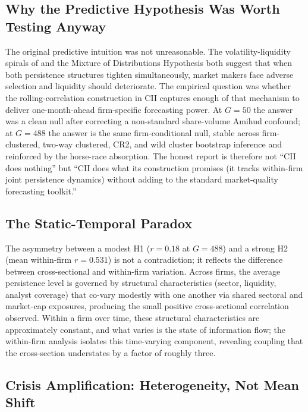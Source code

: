 \documentclass[preprint,12pt,authoryear]{elsarticle}
\begin{document}
\subsection{Why the Predictive Hypothesis Was Worth Testing Anyway}

The original predictive intuition was not unreasonable. The volatility-liquidity spirals of \citet{brunnermeier2009market} and the Mixture of Distributions Hypothesis \citep{clark1973subordinated, andersen1996return} both suggest that when both persistence structures tighten simultaneously, market makers face adverse selection and liquidity should deteriorate. The empirical question was whether the rolling-correlation construction in CII captures enough of that mechanism to deliver one-month-ahead firm-specific forecasting power. At $G = 50$ the answer was a clean null after correcting a non-standard share-volume Amihud confound; at $G = 488$ the answer is the same firm-conditional null, stable across firm-clustered, two-way clustered, CR2, and wild cluster bootstrap inference and reinforced by the horse-race absorption. The honest report is therefore not ``CII does nothing'' but ``CII does what its construction promises (it tracks within-firm joint persistence dynamics) without adding to the standard market-quality forecasting toolkit.''

\subsection{The Static-Temporal Paradox}

The asymmetry between a modest H1 ($r = 0.18$ at $G = 488$) and a strong H2 (mean within-firm $r = 0.531$) is not a contradiction; it reflects the difference between cross-sectional and within-firm variation. Across firms, the average persistence level is governed by structural characteristics (sector, liquidity, analyst coverage) that co-vary modestly with one another via shared sectoral and market-cap exposures, producing the small positive cross-sectional correlation observed. Within a firm over time, these structural characteristics are approximately constant, and what varies is the state of information flow; the within-firm analysis isolates this time-varying component, revealing coupling that the cross-section understates by a factor of roughly three.

\subsection{Crisis Amplification: Heterogeneity, Not Mean Shift}
\label{sec:crisis_amplification}
\end{document}

